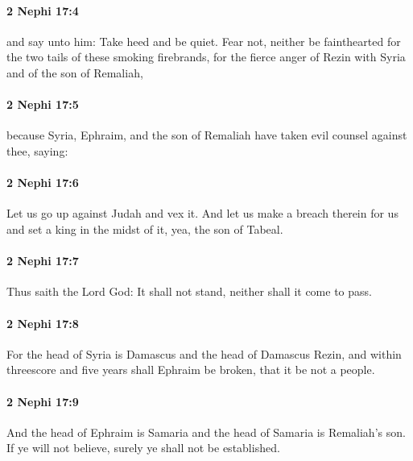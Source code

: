 		\paragraph{2 Nephi 17:4} %
			\label{2NEPHI-17-4}

			and say unto him:
			Take heed and be quiet.
			Fear not, neither be fainthearted
			for the two tails of these smoking firebrands,
			for the fierce anger of Rezin with Syria and of the son of Remaliah,

		\paragraph{2 Nephi 17:5} %
			\label{2NEPHI-17-5}

			because Syria, Ephraim, and the son of Remaliah have taken evil counsel
			against thee, saying:

		\paragraph{2 Nephi 17:6} %
			\label{2NEPHI-17-6}

			Let us go up against Judah and vex it.
			And let us make a breach therein for us
			and set a king in the midst of it,
			yea, the son of Tabeal.

		\paragraph{2 Nephi 17:7} %
			\label{2NEPHI-17-7}

			Thus saith the Lord God:
			It shall not stand, neither shall it come to pass.

		\paragraph{2 Nephi 17:8} %
			\label{2NEPHI-17-8}

			For the head of Syria is Damascus and the head of Damascus Rezin,
			and within threescore and five years shall Ephraim be broken,
			that it be not a people.

		\paragraph{2 Nephi 17:9} %
			\label{2NEPHI-17-9}

			And the head of Ephraim is Samaria
			and the head of Samaria is Remaliah's son.
			If ye will not believe, surely ye shall not be established.

